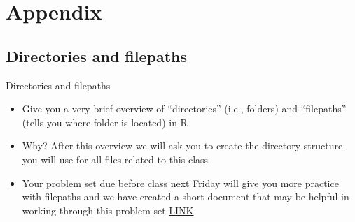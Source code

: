 \documentclass[
  8pt,
  ignorenonframetext,
  dvipsnames]{beamer}
\providecommand{\tightlist}{%
  \setlength{\itemsep}{0pt}\setlength{\parskip}{0pt}}
\let\olditem\item
\renewcommand{\item}{%
  \olditem\vspace{4pt}
}
\begin{document}
\hypertarget{appendix}{%
\section{Appendix}\label{appendix}}

\hypertarget{directories-and-filepaths}{%
\subsection{Directories and filepaths}\label{directories-and-filepaths}}

\begin{frame}{Directories and filepaths}
\protect\hypertarget{directories-and-filepaths-1}{}
\begin{itemize}
\tightlist
\item
  Give you a very brief overview of ``directories'' (i.e., folders) and
  ``filepaths'' (tells you where folder is located) in R
\item
  Why? After this overview we will ask you to create the directory
  structure you will use for all files related to this class
\item
  Your problem set due before class next Friday will give you more
  practice with filepaths and we have created a short document that may
  be helpful in working through this problem set
  \href{https://github.com/anyone-can-cook/rclass1/blob/master/lectures/problemset_resources/problemset_resources.pdf}{LINK}
\end{itemize}
\end{frame}
\end{document}
